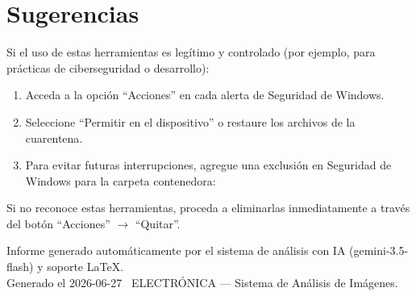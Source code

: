 \documentclass[11pt,a4paper]{article}
\begin{document}
\section*{Sugerencias}
Si el uso de estas herramientas es legítimo y controlado (por ejemplo, para prácticas de ciberseguridad o desarrollo):
\begin{enumerate}[leftmargin=2em, itemsep=2pt]
  \item Acceda a la opción ``Acciones'' en cada alerta de Seguridad de Windows.
  \item Seleccione ``Permitir en el dispositivo'' o restaure los archivos de la cuarentena.
  \item Para evitar futuras interrupciones, agregue una exclusión en Seguridad de Windows
    para la carpeta contenedora:\\[2pt]
\end{enumerate}
Si no reconoce estas herramientas, proceda a eliminarlas inmediatamente a través del botón
``Acciones'' $\rightarrow$ ``Quitar''.

\vspace{12pt}
\begin{center}
  \footnotesize\color{gray}
  Informe generado automáticamente por el sistema de análisis con IA (gemini-3.5-flash) y soporte LaTeX. \\
  Generado el 2026-06-27 \textbullet\ ELECTRÓNICA --- Sistema de Análisis de Imágenes.
\end{center}
\end{document}
